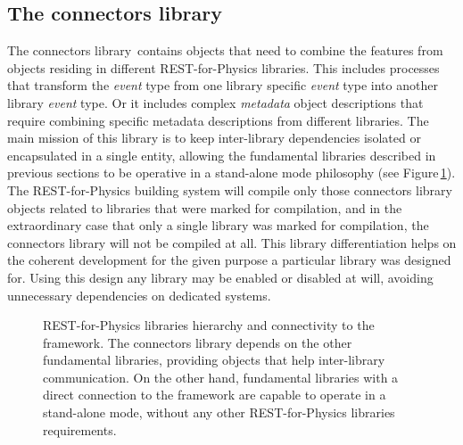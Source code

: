 \subsection{The connectors library}\label{sc:connectorslib}

The connectors library\,\cite{REST_Connectors_Git} contains objects that need to combine the features from objects residing in different REST-for-Physics libraries. This includes processes that transform the \emph{event} type from one library specific \emph{event} type into another library \emph{event} type. Or it includes complex \emph{metadata} object descriptions that require combining specific metadata descriptions from different libraries. The main mission of this library is to keep inter-library dependencies isolated or encapsulated in a single entity, allowing the fundamental libraries described in previous sections to be operative in a stand-alone mode philosophy (see Figure\,\ref{fig:connectorslib}). The REST-for-Physics building system will compile only those connectors library objects related to libraries that were marked for compilation, and in the extraordinary case that only a single library was marked for compilation, the connectors library will not be compiled at all. This library differentiation helps on the coherent development for the given purpose a particular library was designed for. Using this design any library may be enabled or disabled at will, avoiding unnecessary dependencies on dedicated systems.

\begin{figure}[htb!]
  \centering
	\caption{REST-for-Physics libraries hierarchy and connectivity to the framework. The connectors library depends on the other fundamental libraries, providing objects that help inter-library communication. On the other hand, fundamental libraries with a direct connection to the framework are capable to operate in a stand-alone mode, without any other REST-for-Physics libraries requirements.}\label{fig:connectorslib}
\end{figure}

